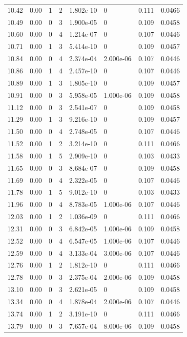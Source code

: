 \documentclass[preview]{standalone}
\begin{document}
{{{\begin{tabular}{L{1.2cm}C{1.2cm} C{0.3cm}C{0.5cm} C{1.4cm}C{1.4cm} C{1.4cm}C{1.4cm}}
  10.42  &  0.00  & 1     &  2 &  1.802e-10  & 0  & 0.111 &  0.0466   \\ 
  10.49  &  0.00  & 0     &  3 &  1.900e-05  & 0  & 0.109 &  0.0458   \\ 
  10.60  &  0.00  & 0     &  4 &  1.214e-07  & 0  & 0.107 &  0.0446   \\ 
  10.71  &  0.00  & 1     &  3 &  5.414e-10  & 0  & 0.109 &  0.0457   \\ 
  10.84  &  0.00  & 0     &  4 &  2.374e-04  & 2.000e-06  & 0.107 &  0.0446   \\ 
  10.86  &  0.00  & 1     &  4 &  2.457e-10  & 0  & 0.107 &  0.0446   \\ 
  10.89  &  0.00  & 1     &  3 &  1.805e-10  & 0  & 0.109 &  0.0457   \\ 
  10.91  &  0.00  & 0     &  3 &  5.958e-05  & 1.000e-06  & 0.109 &  0.0458   \\ 
  11.12  &  0.00  & 0     &  3 &  2.541e-07  & 0  & 0.109 &  0.0458   \\ 
  11.29  &  0.00  & 1     &  3 &  9.216e-10  & 0  & 0.109 &  0.0457   \\ 
  11.50  &  0.00  & 0     &  4 &  2.748e-05  & 0  & 0.107 &  0.0446   \\ 
  11.52  &  0.00  & 1     &  2 &  3.214e-10  & 0  & 0.111 &  0.0466   \\ 
  11.58  &  0.00  & 1     &  5 &  2.909e-10  & 0  & 0.103 &  0.0433   \\ 
  11.65  &  0.00  & 0     &  3 &  8.684e-07  & 0  & 0.109 &  0.0458   \\ 
  11.69  &  0.00  & 0     &  4 &  2.322e-05  & 0  & 0.107 &  0.0446   \\ 
  11.78  &  0.00  & 1     &  5 &  9.012e-10  & 0  & 0.103 &  0.0433   \\ 
  11.96  &  0.00  & 0     &  4 &  8.783e-05  & 1.000e-06  & 0.107 &  0.0446   \\ 
  12.03  &  0.00  & 1     &  2 &  1.036e-09  & 0  & 0.111 &  0.0466   \\ 
  12.31  &  0.00  & 0     &  3 &  6.842e-05  & 1.000e-06  & 0.109 &  0.0458   \\ 
  12.52  &  0.00  & 0     &  4 &  6.547e-05  & 1.000e-06  & 0.107 &  0.0446   \\ 
  12.59  &  0.00  & 0     &  4 &  3.133e-04  & 3.000e-06  & 0.107 &  0.0446   \\ 
  12.76  &  0.00  & 1     &  2 &  1.812e-10  & 0  & 0.111 &  0.0466   \\ 
  12.78  &  0.00  & 0     &  3 &  2.375e-04  & 2.000e-06  & 0.109 &  0.0458   \\ 
  13.10  &  0.00  & 0     &  3 &  2.621e-05  & 0  & 0.109 &  0.0458   \\ 
  13.34  &  0.00  & 0     &  4 &  1.878e-04  & 2.000e-06  & 0.107 &  0.0446   \\ 
  13.74  &  0.00  & 1     &  2 &  3.191e-10  & 0  & 0.111 &  0.0466   \\ 
  13.79  &  0.00  & 0     &  3 &  7.657e-04  & 8.000e-06  & 0.109 &  0.0458   \\ 
\hline 
\end{tabular} 

}}}
\end{document}
